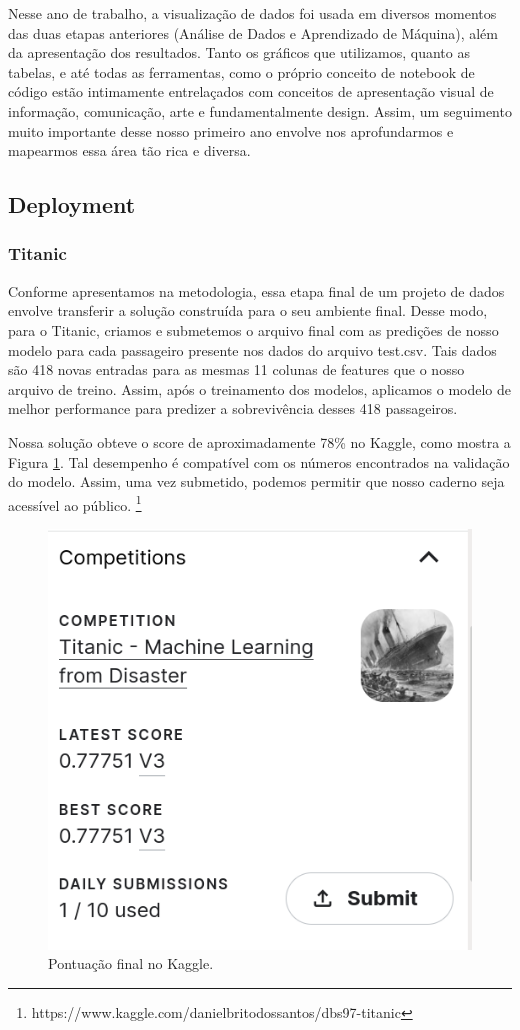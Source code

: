 \documentclass{article}
\begin{document}
Nesse ano de trabalho, a visualização de dados foi usada em diversos momentos das duas etapas anteriores (Análise de Dados e Aprendizado de Máquina), além da apresentação dos resultados. Tanto os gráficos que utilizamos, quanto as tabelas, e até todas as ferramentas, como o próprio conceito de notebook de código estão intimamente entrelaçados com conceitos de apresentação visual de informação, comunicação, arte e fundamentalmente design. 
Assim, um seguimento muito importante desse nosso primeiro ano envolve nos aprofundarmos e mapearmos essa área tão rica e diversa. 

\subsection{Deployment}
\subsubsection{Titanic}
Conforme apresentamos na metodologia, essa etapa final de um projeto de dados envolve transferir a solução construída para o seu ambiente final. Desse modo, para o Titanic, criamos e submetemos o arquivo final com as predições de nosso modelo para cada passageiro presente nos dados do arquivo test.csv. Tais dados são 418 novas entradas para as mesmas 11 colunas de features que o nosso arquivo de treino. Assim, após o treinamento dos modelos, aplicamos o modelo de melhor performance para predizer a sobrevivência desses 418 passageiros. 

Nossa solução obteve o score de aproximadamente 78\% no Kaggle, como mostra a Figura \ref{kaggle.score}. Tal desempenho é compatível com os números encontrados na validação do modelo. Assim, uma vez submetido, podemos permitir que nosso caderno seja acessível ao público. \footnote{https://www.kaggle.com/danielbritodossantos/dbs97-titanic}

\begin{figure}[H]
 \centering
 \includegraphics[width=\textwidth]{Figures/Score.png}
 \caption{\label{kaggle.score}Pontuação final no Kaggle.}
\end{figure}
\end{document}
